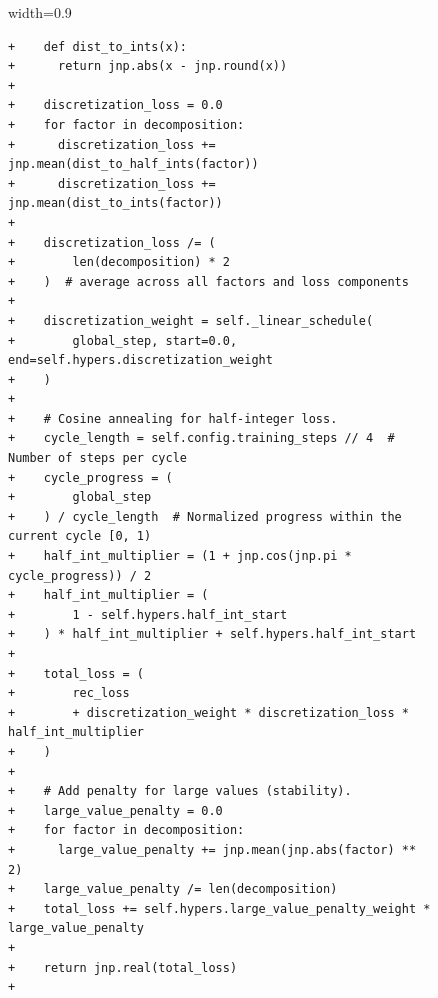 \documentclass[logo,copyright,12pt]{googledeepmind}
\theoremstyle{definition}
\theoremstyle{remark}
\theoremstyle{plain}
\begin{document}
\begin{figure}[p]
\renewcommand{\thefigure}{\arabic{figure}c}\vspace{-0.03\textwidth}
\begin{adjustbox}{width=0.9\textwidth}
\begin{minipage}{0.9\textwidth}
\begin{lstlisting}[style=pydiff, backgroundcolor=\color{backcolour}, firstnumber=131]
+    def dist_to_ints(x):
+      return jnp.abs(x - jnp.round(x))
+
+    discretization_loss = 0.0
+    for factor in decomposition:
+      discretization_loss += jnp.mean(dist_to_half_ints(factor))
+      discretization_loss += jnp.mean(dist_to_ints(factor))
+
+    discretization_loss /= (
+        len(decomposition) * 2
+    )  # average across all factors and loss components
+
+    discretization_weight = self._linear_schedule(
+        global_step, start=0.0, end=self.hypers.discretization_weight
+    )
+
+    # Cosine annealing for half-integer loss.
+    cycle_length = self.config.training_steps // 4  # Number of steps per cycle
+    cycle_progress = (
+        global_step 
+    ) / cycle_length  # Normalized progress within the current cycle [0, 1)
+    half_int_multiplier = (1 + jnp.cos(jnp.pi * cycle_progress)) / 2
+    half_int_multiplier = (
+        1 - self.hypers.half_int_start
+    ) * half_int_multiplier + self.hypers.half_int_start
+
+    total_loss = (
+        rec_loss
+        + discretization_weight * discretization_loss * half_int_multiplier
+    )
+
+    # Add penalty for large values (stability).
+    large_value_penalty = 0.0
+    for factor in decomposition:
+      large_value_penalty += jnp.mean(jnp.abs(factor) ** 2)
+    large_value_penalty /= len(decomposition)
+    total_loss += self.hypers.large_value_penalty_weight * large_value_penalty
+
+    return jnp.real(total_loss)
+
 

\end{lstlisting}
\end{minipage}
\end{adjustbox}
\end{figure}
\end{document}
